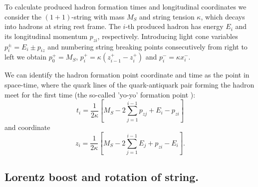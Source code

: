 \hspace{1.0em}To calculate produced hadron formation times and longitudinal 
coordinates we consider the $(1+1)$-string  with mass $M_S$ and string
tension $\kappa$, which decays into hadrons at string rest frame.  The
$i$-th produced hadron has energy $E_i$ and its longitudinal momentum
$p_{zi}$, respectively. Introducing light cone variables $p^{\pm}_{i}=
E_{i} \pm p_{iz}$ and numbering string breaking points consecutively
from right to left we obtain $p^{+}_{0} = M_{S}$, $p_{i}^{+}=\kappa
(z^{+}_{i-1}-z_i^{+})$ and $p_{i}^{-} = \kappa x^{-}_i$.

We can identify the hadron formation point coordinate and time as the
point in space-time, where the quark lines of the quark-antiquark pair
forming the hadron meet for the first time (the so-called 'yo-yo'
formation point \cite{LUND83}): 
\begin{equation}
\label{LSD7}t_i = \frac{1}{2\kappa}[M_S - 2 \sum_{j=1}^{i-1}p_{zj} + E_i -
p_{zi}]
\end{equation}
and coordinate 
\begin{equation}
\label{LSD8}
z_i = \frac{1}{2\kappa}[M_S - 2 \sum_{j=1}^{i-1}E_{j} + p_{zi}- E_i].
\end{equation}

\subsection{Lorentz boost and rotation of string.}

